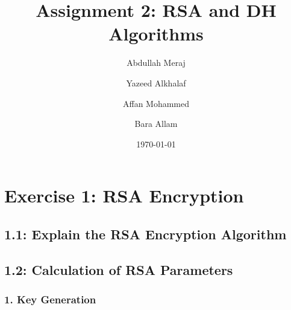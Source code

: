 \documentclass[a4paper]{article}
\title{Assignment 2: RSA and DH Algorithms}
\author{Abdullah Meraj \and Yazeed Alkhalaf \and Affan Mohammed \and Bara Allam}
\date{\today}
\begin{document}
\maketitle
\section*{Exercise 1: RSA Encryption}
\subsection*{1.1: Explain the RSA Encryption Algorithm}
\subsection*{1.2: Calculation of RSA Parameters}
\subsubsection*{1. Key Generation}
\end{document}
